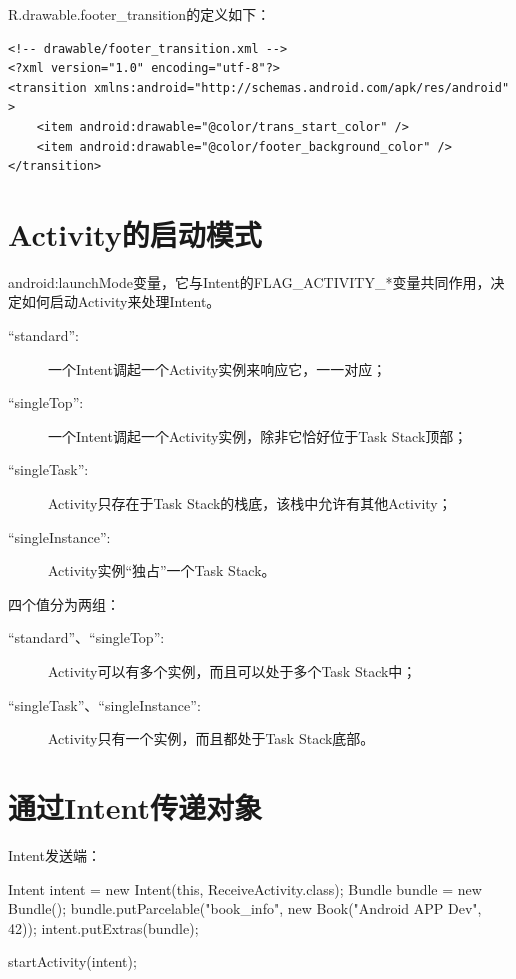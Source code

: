﻿\documentclass[a4paper,11pt]{article}
\begin{document}
  R.drawable.footer\_transition的定义如下：

  \begin{verbatim}
<!-- drawable/footer_transition.xml -->
<?xml version="1.0" encoding="utf-8"?>
<transition xmlns:android="http://schemas.android.com/apk/res/android" >
    <item android:drawable="@color/trans_start_color" />
    <item android:drawable="@color/footer_background_color" />
</transition>
  \end{verbatim}


  \section[Activity的启动模式]{Activity的启动模式}
  android:launchMode变量，它与Intent的FLAG\_ACTIVITY\_*变量共同作用，决定如何启动Activity来处理Intent。

  \begin{description}
    \item[``standard'':] 一个Intent调起一个Activity实例来响应它，一一对应；
    \item[``singleTop'':] 一个Intent调起一个Activity实例，除非它恰好位于Task Stack顶部；
    \item[``singleTask'':] Activity只存在于Task Stack的栈底，该栈中允许有其他Activity；
    \item[``singleInstance'':] Activity实例“独占”一个Task Stack。
  \end{description}

  四个值分为两组：

  \begin{description}
    \item[``standard''、``singleTop'':] Activity可以有多个实例，而且可以处于多个Task Stack中；
    \item[``singleTask''、``singleInstance'':] Activity只有一个实例，而且都处于Task Stack底部。
  \end{description}


  \section[通过Intent传递对象]{通过Intent传递对象}
  Intent发送端：\par
  \begin{javacode}
Intent intent = new Intent(this, ReceiveActivity.class);
Bundle bundle = new Bundle();
bundle.putParcelable("book_info", new Book("Android APP Dev", 42));
intent.putExtras(bundle);

startActivity(intent);
  \end{javacode}
\end{document}
